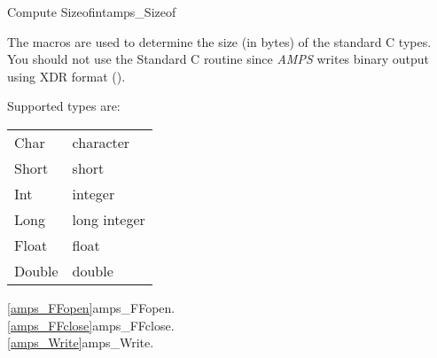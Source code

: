 \begin{deftypevr}{Compute Sizeof}{int}{amps\_Sizeof}
\DESCRIPTION

The macros  are used to
determine the size (in bytes) of the standard C types.  You should not
use the Standard C  routine since {\em AMPS} writes
binary output using XDR format (\cite{xdr.87}).

Supported types are:

\begin{tabular}{ll}
Char & character \\
Short & short \\
Int & integer \\
Long & long integer \\
Float & float \\
Double & double
\end{tabular}

\SEEALSO
\vref{amps_FFopen}{amps\_FFopen}. \\
\vref{amps_FFclose}{amps\_FFclose}. \\
\vref{amps_Write}{amps\_Write}. \\

\end{deftypevr}







\printindex


